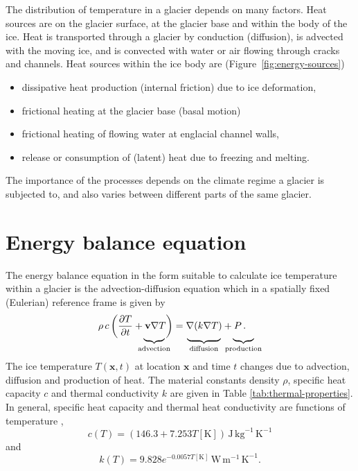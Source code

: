 \documentclass[parskip=half]{scrartcl}
\begin{document}
The distribution of temperature in a glacier depends on many factors.  Heat
sources are on the glacier surface, at the glacier base and within the body of
the ice.  Heat is transported through a glacier by conduction (diffusion), is
advected with the moving ice, and is convected with water or air flowing
through cracks and channels.  Heat sources within the ice body are (Figure~\ref{fig:energy-sources})
%
\begin{itemize}\itemsep0ex
\item dissipative heat production (internal friction) due to ice deformation,
\item frictional heating at the glacier base (basal motion)
\item frictional heating of flowing water at englacial channel walls,
\item release or consumption of (latent) heat due to freezing and melting.
\end{itemize}
%
The importance of the processes depends on the climate regime a glacier is
subjected to, and also varies between different parts of the same glacier.


\section{Energy balance equation}
\label{sec:energy-balance}

The energy balance equation in the form suitable to calculate ice temperature
within a glacier is the advection-diffusion equation which in a spatially
fixed (Eulerian) reference frame is given by
%
\begin{align}
 \label{eq:heat-diffusion-advection}
 \rho\, c \left(\frac{\partial T}{\partial t} + \mathbf{v} \nabla T\right) &=
 \nabla(k\nabla T) + P\,.\\[-3ex]
 \underbrace{\rule{5ex}{0ex}}_{\text{advection}} \; & \hspace{3ex}
 \underbrace{\rule{8ex}{0ex}}_{\text{diffusion}} \;
 \underbrace{\rule{5ex}{0ex}}_{\text{production}} \notag
\end{align}
%
The ice temperature $T(\mathbf{x},t)$ at location $\mathbf{x}$ and time $t$
changes due to advection, diffusion and production of heat.  The material
constants density $\rho$, specific heat capacity $c$ and thermal conductivity
$k$ are given in Table \ref{tab:thermal-properties}. In general, specific heat capacity and thermal heat conductivity are functions of temperature \citep[e.g.][]{Ritz1987},
\begin{equation}
  \label{eq:specific-heat}
  c(T) = (146.3 + 7.253  T [\text{K}])\,\text{J}\,\text{kg}^{-1}\,\text{K}^{-1}
\end{equation} and
\begin{equation}
  \label{eq:heat-conductivity}
  k(T) = 9.828 e^{-0.0057 T [\text{K}]}\,\text{W}\,\text{m}^{-1}\,\text{K}^{-1}.
\end{equation}
\end{document}
